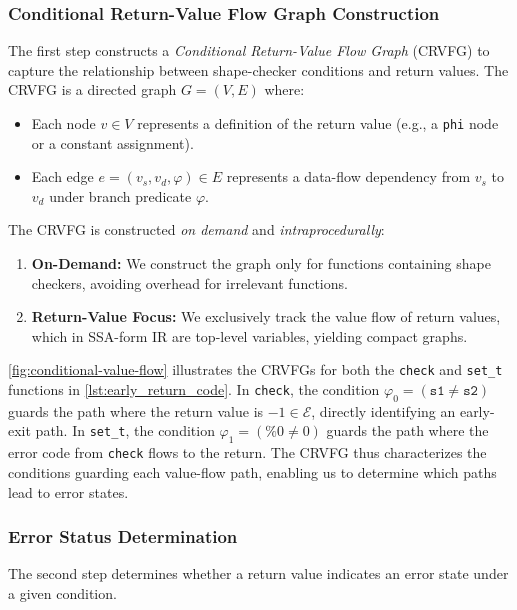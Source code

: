 \subsubsection{Conditional Return-Value Flow Graph Construction}\label{sec:design:crvfg}

The first step constructs a \textit{Conditional Return-Value Flow Graph} (CRVFG) to capture the relationship between shape-checker conditions and return values.
The CRVFG is a directed graph $G = (V, E)$ where:
\begin{itemize}
	\item Each node $v \in V$ represents a definition of the return value (e.g., a \texttt{phi} node or a constant assignment).
	\item Each edge $e = (v_s, v_d, \varphi) \in E$ represents a data-flow dependency from $v_s$ to $v_d$ under branch predicate $\varphi$.
\end{itemize}

The CRVFG is constructed \textit{on demand} and \textit{intraprocedurally}:
\begin{enumerate}
	\item \textbf{On-Demand:} We construct the graph only for functions containing shape checkers, avoiding overhead for irrelevant functions.
	\item \textbf{Return-Value Focus:} We exclusively track the value flow of return values, which in SSA-form IR are top-level variables, yielding compact graphs.
\end{enumerate}

\autoref{fig:conditional-value-flow} illustrates the CRVFGs for both the \texttt{check} and \texttt{set\_t} functions in \autoref{lst:early_return_code}.
In \texttt{check}, the condition $\varphi_0 = (\texttt{s1} \neq \texttt{s2})$ guards the path where the return value is $-1 \in \mathcal{E}$, directly identifying an early-exit path.
In \texttt{set\_t}, the condition $\varphi_1 = (\%0 \neq 0)$ guards the path where the error code from \texttt{check} flows to the return.
The CRVFG thus characterizes the conditions guarding each value-flow path, enabling us to determine which paths lead to error states.

\subsubsection{Error Status Determination}\label{sec:design:error-determination}

The second step determines whether a return value indicates an error state under a given condition.


